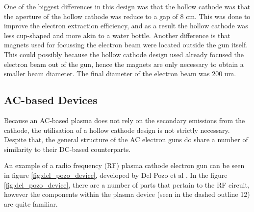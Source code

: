 One of the biggest differences in this design was that the hollow cathode was that the aperture of the hollow cathode was reduce to a gap of 8 cm. This was done to improve the electron extraction efficiency, and as a result the hollow cathode was less cup-shaped and more akin to a water bottle. Another difference is that magnets used for focussing the electron beam were located outside the gun itself. This could possibly because the hollow cathode design used already focused the electron beam out of the gun, hence the magnets are only necessary to obtain a smaller beam diameter. The final diameter of the electron beam was 200 um.  


\subsection{AC-based Devices}

Because an AC-based plasma does not rely on the secondary emissions from the cathode, the utilisation of a hollow cathode design is not strictly necessary. Despite that, the general structure of the AC electron guns do share a number of similarity to their DC-based counterparts.

An example of a radio frequency (RF) plasma cathode electron gun can be seen in figure \ref{fig:del_pozo_device}, developed by Del Pozo et al \cite{Pozo2014}. In the figure \ref{fig:del_pozo_device}, there are a number of parts that pertain to the RF circuit, however the components within the plasma device (seen in the dashed outline 12) are quite familiar. 

